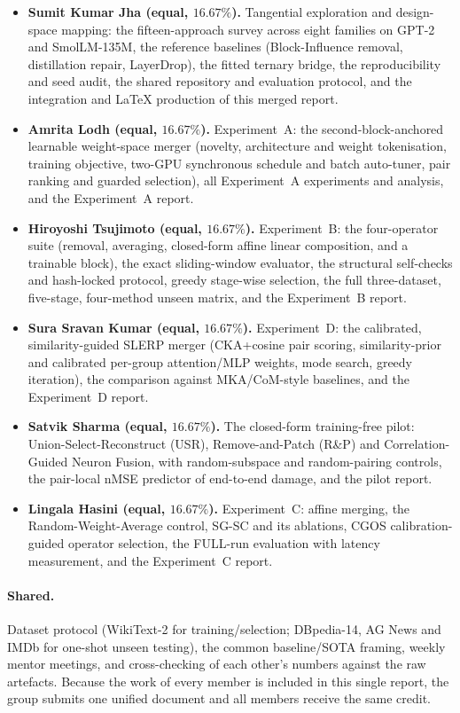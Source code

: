 \documentclass[10pt,a4paper]{article}
\begin{document}
\begin{itemize}
  \item \textbf{Sumit Kumar Jha (equal, $16.67\%$).} Tangential exploration and
    design-space mapping: the fifteen-approach survey across eight families on
    GPT-2 and SmolLM-135M, the reference baselines (Block-Influence removal,
    distillation repair, LayerDrop), the fitted ternary bridge, the
    reproducibility and seed audit, the shared repository and evaluation
    protocol, and the integration and \LaTeX{} production of this merged
    report.
  \item \textbf{Amrita Lodh (equal, $16.67\%$).} Experiment~A: the
    second-block-anchored learnable weight-space merger (novelty, architecture
    and weight tokenisation, training objective, two-GPU synchronous schedule
    and batch auto-tuner, pair ranking and guarded selection), all
    Experiment~A experiments and analysis, and the Experiment~A report.
  \item \textbf{Hiroyoshi Tsujimoto (equal, $16.67\%$).} Experiment~B: the
    four-operator suite (removal, averaging, closed-form affine linear
    composition, and a trainable block), the exact sliding-window evaluator,
    the structural self-checks and hash-locked protocol, greedy stage-wise
    selection, the full three-dataset, five-stage, four-method unseen matrix,
    and the Experiment~B report.
  \item \textbf{Sura Sravan Kumar (equal, $16.67\%$).} Experiment~D: the
    calibrated, similarity-guided SLERP merger (CKA+cosine pair scoring,
    similarity-prior and calibrated per-group attention/MLP weights, mode
    search, greedy iteration), the comparison against MKA/CoM-style baselines,
    and the Experiment~D report.
  \item \textbf{Satvik Sharma (equal, $16.67\%$).} The closed-form
    training-free pilot: Union-Select-Reconstruct (USR), Remove-and-Patch
    (R\&P) and Correlation-Guided Neuron Fusion, with random-subspace and
    random-pairing controls, the pair-local nMSE predictor of end-to-end
    damage, and the pilot report.
  \item \textbf{Lingala Hasini (equal, $16.67\%$).} Experiment~C: affine
    merging, the Random-Weight-Average control, SG-SC and its ablations, CGOS
    calibration-guided operator selection, the FULL-run evaluation with
    latency measurement, and the Experiment~C report.
\end{itemize}

\paragraph{Shared.} Dataset protocol (WikiText-2 for training/selection;
DBpedia-14, AG News and IMDb for one-shot unseen testing), the common
baseline/SOTA framing, weekly mentor meetings, and cross-checking of each
other's numbers against the raw artefacts. Because the work of every member is
included in this single report, the group submits one unified document and all
members receive the same credit.



\end{document}
